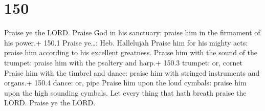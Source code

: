 \hypertarget{section-151}{%
\section{150}\label{section-151}}

 Praise ye the LORD. Praise God in his sanctuary: praise
him in the firmament of his power.+ 150.1 Praise ye\ldots: Heb.
Hallelujah  Praise him for his mighty acts: praise him
according to his excellent greatness.  Praise him with the
sound of the trumpet: praise him with the psaltery and harp.+ 150.3
trumpet: or, cornet  Praise him with the timbrel and
dance: praise him with stringed instruments and organs.+ 150.4 dance:
or, pipe  Praise him upon the loud cymbals: praise him
upon the high sounding cymbals.  Let every thing that hath
breath praise the LORD. Praise ye the LORD.

